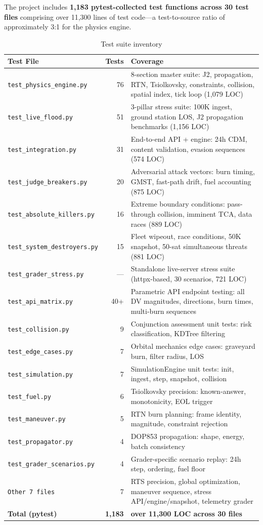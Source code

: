 \documentclass[11pt,a4paper]{article}
\begin{document}
The project includes \textbf{1,183 pytest-collected test functions across 30 test files}
comprising over 11,300 lines of test code---a test-to-source ratio of approximately
3:1 for the physics engine.

\begin{table}[H]
\centering
\caption{Test suite inventory}
\begin{tabular}{@{}lrp{6.5cm}@{}}
\toprule
\textbf{Test File} & \textbf{Tests} & \textbf{Coverage} \\
\midrule
\texttt{test\_physics\_engine.py} & 76 & 8-section master suite: J2, propagation, RTN, Tsiolkovsky, constraints, collision, spatial index, tick loop (1,079 LOC) \\
\texttt{test\_live\_flood.py} & 51 & 3-pillar stress suite: 100K ingest, ground station LOS, J2 propagation benchmarks (1,156 LOC) \\
\texttt{test\_integration.py} & 31 & End-to-end API + engine: 24h CDM, content validation, evasion sequences (574 LOC) \\
\texttt{test\_judge\_breakers.py} & 20 & Adversarial attack vectors: burn timing, GMST, fast-path drift, fuel accounting (875 LOC) \\
\texttt{test\_absolute\_killers.py} & 16 & Extreme boundary conditions: pass-through collision, imminent TCA, data races (889 LOC) \\
\texttt{test\_system\_destroyers.py} & 15 & Fleet wipeout, race conditions, 50K snapshot, 50-sat simultaneous threats (881 LOC) \\
\texttt{test\_grader\_stress.py} & --- & Standalone live-server stress suite (httpx-based, 30 scenarios, 721 LOC) \\
\texttt{test\_api\_matrix.py} & 40+ & Parametric API endpoint testing: all DV magnitudes, directions, burn times, multi-burn sequences \\
\texttt{test\_collision.py} & 9 & Conjunction assessment unit tests: risk classification, KDTree filtering \\
\texttt{test\_edge\_cases.py} & 7 & Orbital mechanics edge cases: graveyard burn, filter radius, LOS \\
\texttt{test\_simulation.py} & 7 & SimulationEngine unit tests: init, ingest, step, snapshot, collision \\
\texttt{test\_fuel.py} & 6 & Tsiolkovsky precision: known-answer, monotonicity, EOL trigger \\
\texttt{test\_maneuver.py} & 5 & RTN burn planning: frame identity, magnitude, constraint rejection \\
\texttt{test\_propagator.py} & 4 & DOP853 propagation: shape, energy, batch consistency \\
\texttt{test\_grader\_scenarios.py} & 4 & Grader-specific scenario replay: 24h step, ordering, fuel floor \\
\texttt{Other 7 files} & 7 & RTS precision, global optimization, maneuver sequence, stress API/engine/snapshot, telemetry grader \\
\midrule
\textbf{Total (pytest)} & \textbf{1,183} & \textbf{over 11,300 LOC across 30 files} \\
\bottomrule
\end{tabular}
\end{table}
\end{document}
